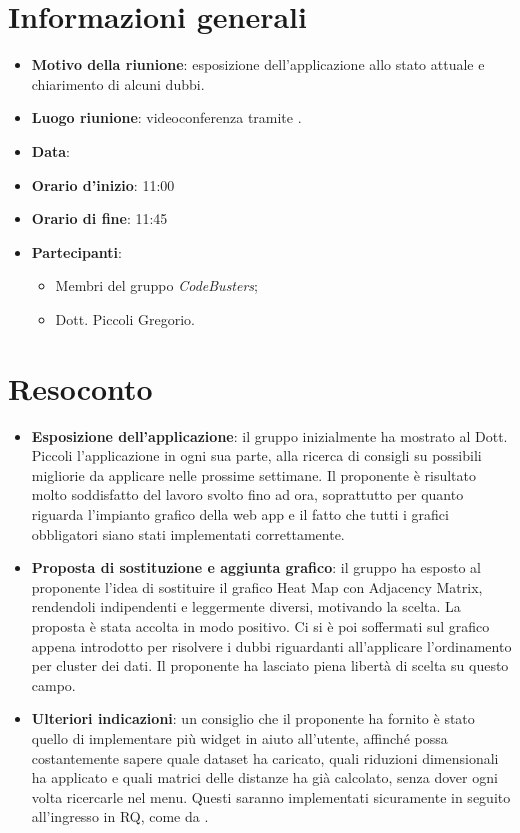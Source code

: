 \section{Informazioni generali}
\begin{itemize}
\item \textbf{Motivo della riunione}: esposizione dell'applicazione allo stato attuale e chiarimento di alcuni dubbi.
\item \textbf{Luogo riunione}: videoconferenza tramite .
\item \textbf{Data}: \Data{}
\item \textbf{Orario d'inizio}: 11:00 
\item \textbf{Orario di fine}: 11:45 
\item \textbf{Partecipanti}:
	\begin{itemize}
	\item Membri del gruppo \textit{CodeBusters};
	\item Dott. Piccoli Gregorio.
	\end{itemize}
\end{itemize}

\section{Resoconto}
\begin{itemize}
 	\item \textbf{Esposizione dell'applicazione}: il gruppo inizialmente ha mostrato al Dott. Piccoli l'applicazione in ogni sua parte, alla ricerca di consigli su possibili migliorie da applicare nelle prossime settimane. Il proponente è risultato molto soddisfatto del lavoro svolto fino ad ora, soprattutto per quanto riguarda l'impianto grafico della web app e il fatto che tutti i grafici obbligatori siano stati implementati correttamente.

 	\item  \textbf{Proposta di sostituzione e aggiunta grafico}: il gruppo ha esposto al proponente l'idea di sostituire il grafico Heat Map con Adjacency Matrix, rendendoli indipendenti e leggermente diversi, motivando la scelta. La proposta è stata accolta in modo positivo. Ci si è poi soffermati sul grafico appena introdotto per risolvere i dubbi riguardanti all'applicare l'ordinamento per cluster dei dati. Il proponente ha lasciato piena libertà di scelta su questo campo.
 	
   \item \textbf{Ulteriori indicazioni}: un consiglio che il proponente ha fornito è stato quello di implementare più widget in aiuto all'utente, affinché possa costantemente sapere quale dataset ha caricato, quali riduzioni dimensionali ha applicato e quali matrici delle distanze ha già calcolato, senza dover ogni volta ricercarle nel menu. Questi saranno implementati sicuramente in seguito all'ingresso in RQ, come da \PdP{}.

\end{itemize}

\newpage